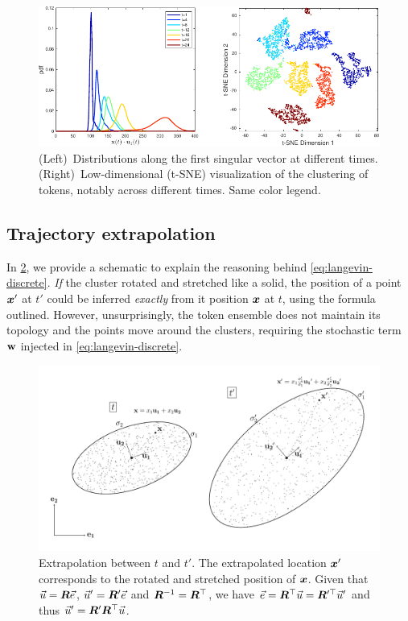 \documentclass{article} %
\begin{document}
\begin{figure}[htbp]
\vskip 0.2in
\begin{center}
\centerline{\includegraphics[scale=1]{fig/figS-clustering.pdf}}
\caption{
(Left)~Distributions along the first singular vector at different times. 
(Right)~Low-dimensional (t-SNE) visualization of the clustering of tokens, notably across different times. Same color legend.
}
\label{fig:clustering}
\end{center}
\vskip -0.2in
\end{figure}

\subsection{Trajectory extrapolation}
\label{app:traj-extrapolation}
In \cref{fig:extrapolation-schematic}, we provide a schematic to explain the reasoning behind \cref{eq:langevin-discrete}.
\emph{If} the cluster rotated and stretched like a solid, the position of a point ${\bm{x}}'$ at $t'$ could be inferred \emph{exactly} from it position ${\bm{x}}$ at $t$, using the formula outlined.
However, unsurprisingly, the token ensemble does not maintain its topology and the points move around the clusters, requiring the stochastic term ${\mathbf{w}}$ injected in \cref{eq:langevin-discrete}.

\begin{figure}[htbp]
\vskip 0.2in
\begin{center}
\centerline{\includegraphics[width=\columnwidth]{fig/fig_extrapolation_schematic.pdf}}
\caption{
Extrapolation between $t$ and $t'$. 
The extrapolated location ${\bm{x}}'$ corresponds to the rotated and stretched position of ${\bm{x}}$.
Given that $\vec{u} = {\bm{R}} \vec{e}$, $\vec{u}' = {\bm{R}}' \vec{e}$ and ${\bm{R}}^{-1} = {\bm{R}}^{\top}$, we have $\vec{e} = {\bm{R}}^{\top} \vec{u} = {\bm{R}}'^{\top} \vec{u}'$ and thus $\vec{u}' = {\bm{R}}' {\bm{R}}^{\top} \vec{u}$.
}
\label{fig:extrapolation-schematic}
\end{center}
\vskip -0.2in
\end{figure}
\end{document}
